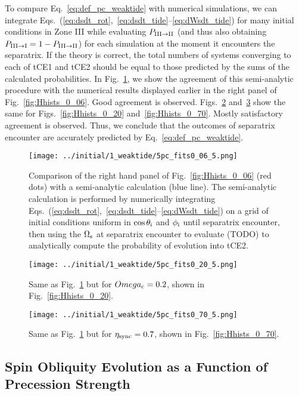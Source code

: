 \documentclass[
        fleqn,
        usenatbib,
    ]{mnras}
\begin{document}
To compare Eq.~\eqref{eq:def_pc_weaktide} with numerical simulations, we can
integrate Eqs.~(\ref{eq:dsdt_rot},~\ref{eq:dsdt_tide}--\ref{eq:dWsdt_tide}) for
many initial conditions in Zone III while evaluating $P_{\rm III \to II}$ (and
thus also obtaining $P_{\rm III \to I} = 1 - P_{\rm III \to II}$) for
each simulation at the moment it encounters the separatrix. If the theory is
correct, the total numbers of systems converging to each of tCE1 and tCE2
should be equal to those predicted by the sums of the calculated probabilities.
In Fig.~\ref{fig:pc_fits_0_06}, we show the agreement of this semi-analytic
procedure with the numerical results displayed earlier in the right
panel of Fig.~\ref{fig:Hhists_0_06}. Good agreement is observed.
Figs.~\ref{fig:pc_fits_0_20} and~\ref{fig:pc_fits_0_70} show the same for
Figs.~\ref{fig:Hhists_0_20} and~\ref{fig:Hhists_0_70}. Mostly satisfactory
agreement is observed. Thus, we conclude that the outcomes of separatrix
encounter are accurately predicted by Eq.~\eqref{eq:def_pc_weaktide}.
\begin{figure}
    \centering
    \texttt{[image: ../initial/1\_weaktide/5pc\_fits0\_06\_5.png]}
    \caption{Comparison of the right hand panel of Fig.~\ref{fig:Hhists_0_06}
    (red dots) with a semi-analytic calculation (blue line). The semi-analytic
    calculation is performed by numerically integrating
    Eqs.~(\ref{eq:dsdt_rot},~\ref{eq:dsdt_tide}--\ref{eq:dWsdt_tide}) on a grid of initial
    conditions uniform in $\cos \theta_{\rm i}$ and $\phi_{\rm i}$ until
    separatrix encounter, then using the $\Omega_{\rm s}$ at separatrix
    encounter to evaluate (TODO) to analytically compute the probability of
    evolution into tCE2.}\label{fig:pc_fits_0_06}
\end{figure}
\begin{figure}
    \centering
    \texttt{[image: ../initial/1\_weaktide/5pc\_fits0\_20\_5.png]}
    \caption{Same as Fig.~\ref{fig:pc_fits_0_06} but for $Omega_{\rm c} =
    0.2$, shown in Fig.~\ref{fig:Hhists_0_20}.}\label{fig:pc_fits_0_20}
\end{figure}
\begin{figure}
    \centering
    \texttt{[image: ../initial/1\_weaktide/5pc\_fits0\_70\_5.png]}
    \caption{Same as Fig.~\ref{fig:pc_fits_0_06} but for $\eta_{\rm sync} =
    0.7$, shown in Fig.~\ref{fig:Hhists_0_70}.}\label{fig:pc_fits_0_70}
\end{figure}

\subsection{Spin Obliquity Evolution as a Function of Precession Strength}
\end{document}
